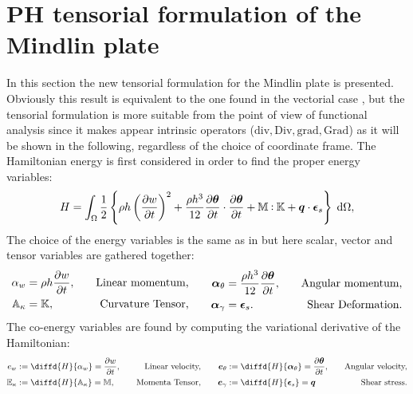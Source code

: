 \documentclass[11t]{article}
\def\onedot{$\mathsurround0pt\ldotp$}
\def\cddot{%
	\mathbin{\vcenter{\baselineskip.67ex
			\hbox{\onedot}\hbox{\onedot}}%
}}
\begin{document}
	\section{PH tensorial formulation of the Mindlin plate}
	\label{sec:PH_ten_Min}
	In this section the new tensorial formulation for the Mindlin plate is presented. {Obviously this result is equivalent to the one found in the vectorial case \cite{MacchelliMindlin}, but the tensorial formulation is more suitable from the point of view of functional analysis since it makes appear intrinsic operators ($\mathrm{div}, \mathrm{Div}, \mathrm{grad}, \mathrm{Grad}$) as it will be shown in the following, regardless of the choice of coordinate frame. \newline
		The Hamiltonian energy is first considered in order to find the proper energy variables:
		\begin{equation}
		\label{eq:H_min}
		H = \int_{\Omega} \frac{1}{2} \left\{ \rho h \left(\diffp{w}{t} \right)^2 + \frac{\rho h^3}{12} \diffp{\bm{\theta}}{t} \cdot   \diffp{\bm{\theta}}{t} +   \mathbb{M} \cddot \mathbb{K} + \bm{q} \cdot \bm{\epsilon}_s  \right\}  \d\Omega, 
		\end{equation}
		The choice of the energy variables is the same as in \cite{MacchelliMindlin} but here scalar,}  vector and tensor variables are gathered together:
	\begin{equation}
	\begin{aligned}
	\alpha_w &= \rho h \diffp{w}{t}, \quad &\text{Linear momentum,} \\
	\mathbb{A}_{\kappa} &= \mathbb{K}, \quad &\text{Curvature Tensor,} \\
	\end{aligned} \qquad
	\begin{aligned}
	\bm\alpha_{\theta} &=  \frac{\rho h^3}{12} \diffp{\bm{\theta}}{t}, \quad &\text{Angular momentum,}\\
	\bm\alpha_{\gamma} &= \bm{\epsilon}_s. \quad &\text{Shear Deformation.}\\
	\end{aligned}
	\end{equation}
	The co-energy variables are found by computing the variational derivative of the Hamiltonian:
	\begin{equation}
	\begin{aligned}
	e_w &:= \diffd{H}{\alpha_w} = \diffp{w}{t},  \quad &\text{Linear velocity,} \\
	\mathbb{E}_{\kappa} &:= \diffd{H}{\mathbb{A}_{\kappa}} = \mathbb{M}, \quad &\text{Momenta Tensor,}\\
	\end{aligned} \qquad
	\begin{aligned}
	\bm{e}_{\theta} &:= \diffd{H}{\bm\alpha_{\theta}} = \diffp{\bm{\theta}}{t}, \quad &\text{Angular velocity,}  \\
	\bm{e}_{\gamma} &:= \diffd{H}{\bm{\epsilon}_s} = \bm{q} \quad &\text{Shear stress.} \\
	\end{aligned}
	\end{equation}
\end{document}
